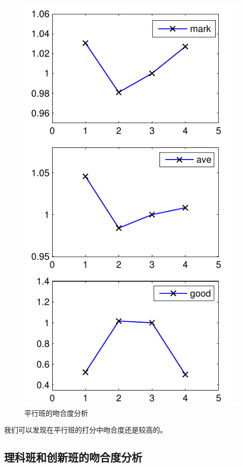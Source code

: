 \documentclass[a4paper]{article}
\begin{document}
  \begin{figure}[H]
  \centerline{\includegraphics[scale=0.5]{coincidenorm.pdf}}
  \caption{平行班的吻合度分析}
  \end{figure}

  我们可以发现在平行班的打分中吻合度还是较高的。

 \clearpage

 \subsection{理科班和创新班的吻合度分析}
\end{document}
